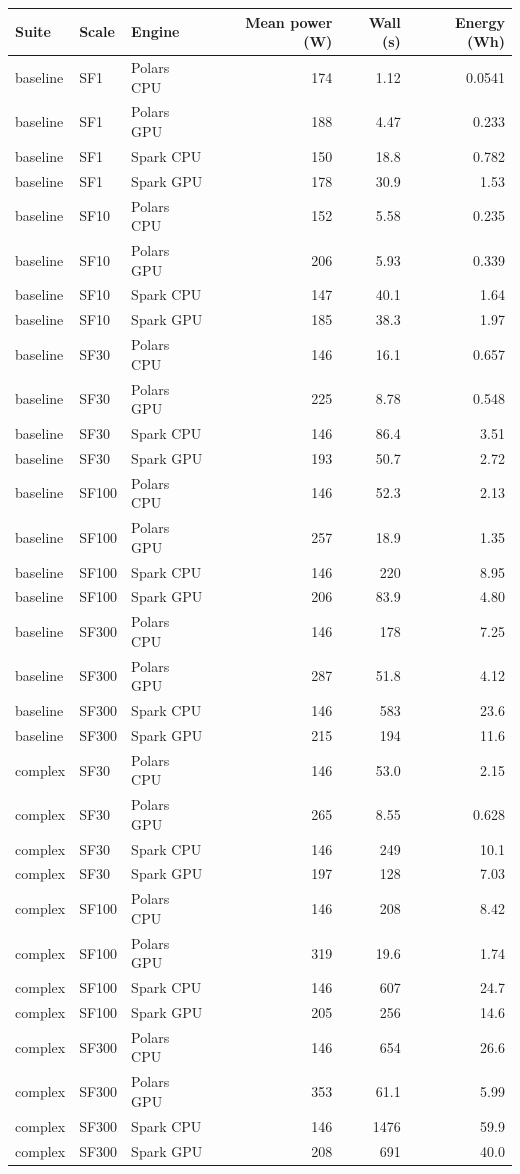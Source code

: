 \begin{longtable}{lllrrr}
\toprule
Suite & Scale & Engine & Mean power (W) & Wall (s) & Energy (Wh) \\
\midrule
\endhead
\bottomrule
\endfoot
baseline & SF1 & Polars CPU & 174 & 1.12 & 0.0541 \\
baseline & SF1 & Polars GPU & 188 & 4.47 & 0.233 \\
baseline & SF1 & Spark CPU & 150 & 18.8 & 0.782 \\
baseline & SF1 & Spark GPU & 178 & 30.9 & 1.53 \\
baseline & SF10 & Polars CPU & 152 & 5.58 & 0.235 \\
baseline & SF10 & Polars GPU & 206 & 5.93 & 0.339 \\
baseline & SF10 & Spark CPU & 147 & 40.1 & 1.64 \\
baseline & SF10 & Spark GPU & 185 & 38.3 & 1.97 \\
baseline & SF30 & Polars CPU & 146 & 16.1 & 0.657 \\
baseline & SF30 & Polars GPU & 225 & 8.78 & 0.548 \\
baseline & SF30 & Spark CPU & 146 & 86.4 & 3.51 \\
baseline & SF30 & Spark GPU & 193 & 50.7 & 2.72 \\
baseline & SF100 & Polars CPU & 146 & 52.3 & 2.13 \\
baseline & SF100 & Polars GPU & 257 & 18.9 & 1.35 \\
baseline & SF100 & Spark CPU & 146 & 220 & 8.95 \\
baseline & SF100 & Spark GPU & 206 & 83.9 & 4.80 \\
baseline & SF300 & Polars CPU & 146 & 178 & 7.25 \\
baseline & SF300 & Polars GPU & 287 & 51.8 & 4.12 \\
baseline & SF300 & Spark CPU & 146 & 583 & 23.6 \\
baseline & SF300 & Spark GPU & 215 & 194 & 11.6 \\
complex & SF30 & Polars CPU & 146 & 53.0 & 2.15 \\
complex & SF30 & Polars GPU & 265 & 8.55 & 0.628 \\
complex & SF30 & Spark CPU & 146 & 249 & 10.1 \\
complex & SF30 & Spark GPU & 197 & 128 & 7.03 \\
complex & SF100 & Polars CPU & 146 & 208 & 8.42 \\
complex & SF100 & Polars GPU & 319 & 19.6 & 1.74 \\
complex & SF100 & Spark CPU & 146 & 607 & 24.7 \\
complex & SF100 & Spark GPU & 205 & 256 & 14.6 \\
complex & SF300 & Polars CPU & 146 & 654 & 26.6 \\
complex & SF300 & Polars GPU & 353 & 61.1 & 5.99 \\
complex & SF300 & Spark CPU & 146 & 1476 & 59.9 \\
complex & SF300 & Spark GPU & 208 & 691 & 40.0 \\
\end{longtable}
